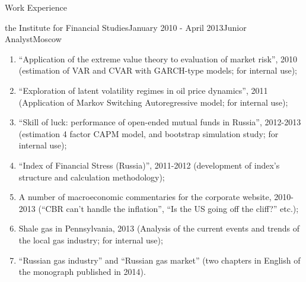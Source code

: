 \documentclass{resume} %
\begin{document}
\begin{rSection}{Work Experience}
\begin{rSubsection}{the Institute for Financial Studies}{January 2010 - April 2013}{Junior Analyst}{Moscow}
\begin{enumerate}
        \item ``Application of the extreme value theory to evaluation of market risk'',
        2010 (estimation of VAR and CVAR with GARCH-type models; for internal use);
        
        \item ``Exploration of latent volatility regimes in oil price dynamics'',
        2011 (Application of Markov Switching Autoregressive model; for internal use);
        
        \item ``Skill of luck: performance of open-ended mutual funds in Russia'',
        2012-2013 (estimation 4 factor CAPM model, and bootstrap simulation study;
        for internal use);
        
        \item ``Index of Financial Stress (Russia)'', 2011-2012 (development of index's
        structure and calculation methodology);
        
        \item A number of macroeconomic commentaries for the corporate website, 2010-2013
        (``CBR can't handle the inflation'', ``Is the US going off the cliff?'' etc.);
        
        \item Shale gas in Pennsylvania, 2013 (Analysis of the current events and
        trends of the local gas industry; for internal use);
        
        \item ``Russian gas industry'' and ``Russian gas market'' (two chapters in English
        of the monograph published in 2014).
    \end{enumerate}
\end{rSubsection}

\end{rSection}
\end{document}

